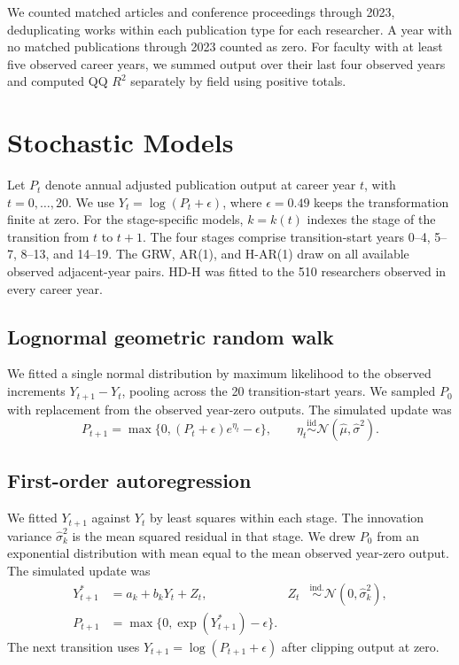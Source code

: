 \documentclass[9pt,twoside,lineno]{pnas-new}
\begin{document}
We counted matched articles and conference proceedings through 2023,
deduplicating works within each publication type for each researcher.
A year with no matched publications through 2023 counted as zero.
For faculty with at least five observed career years, we summed output
over their last four observed years and computed QQ $R^2$ separately
by field using positive totals.

\section*{Stochastic Models}

Let $P_t$ denote annual adjusted publication output at career year
$t$, with $t=0,\ldots,20$. We use $Y_t=\log(P_t+\epsilon)$, where
$\epsilon=0.49$ keeps the transformation finite at zero. For the
stage-specific models, $k=k(t)$ indexes the stage of the transition
from $t$ to $t+1$. The four stages comprise transition-start years
0--4, 5--7, 8--13, and 14--19. The GRW, AR(1), and H-AR(1) draw
on all available observed adjacent-year pairs. HD-H was fitted to
the 510 researchers observed in every career year.

\subsection*{Lognormal geometric random walk}

We fitted a single normal distribution by maximum likelihood to the
observed increments $Y_{t+1}-Y_t$, pooling across the 20
transition-start years. We sampled $P_0$ with replacement from the
observed year-zero outputs. The simulated update was
\begin{equation}
P_{t+1}=\max\{0,(P_t+\epsilon)e^{\eta_t}-\epsilon\},
\qquad
\eta_t\overset{\mathrm{iid}}{\sim}
\mathcal{N}(\hat\mu,\hat\sigma^2).
\label{eq:grw}
\end{equation}

\subsection*{First-order autoregression}

We fitted $Y_{t+1}$ against $Y_t$ by least squares within each stage.
The innovation variance $\hat\sigma_k^2$ is the mean squared residual
in that stage. We drew $P_0$ from an exponential distribution with
mean equal to the mean observed year-zero output. The simulated
update was
\begin{equation}
\begin{aligned}
Y_{t+1}^{*} &= a_k+b_kY_t+Z_t,
& Z_t &\overset{\mathrm{ind.}}{\sim}\mathcal{N}(0,\hat\sigma_k^2),\\
P_{t+1} &= \max\{0,\exp(Y_{t+1}^{*})-\epsilon\}.
\end{aligned}
\label{eq:ar1}
\end{equation}
The next transition uses $Y_{t+1}=\log(P_{t+1}+\epsilon)$ after
clipping output at zero.
\end{document}
